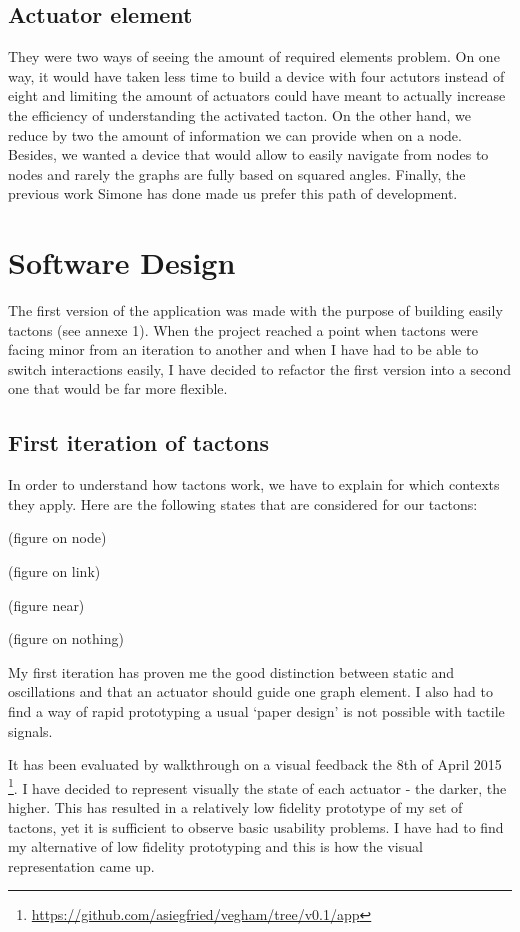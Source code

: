 \subsection{Actuator element}\label{actuator-element}

They were two ways of seeing the amount of required elements problem. On one way, it would have taken less time to build a device with four actutors instead of eight and limiting the amount of actuators could have meant to actually increase the efficiency of understanding the activated tacton. On the other hand, we reduce by two the amount of information we can provide when on a node. Besides, we wanted a device that would allow to easily navigate from nodes to nodes and rarely the graphs are fully based on squared angles. Finally, the previous work Simone has done made us prefer this path of development.

\section{Software Design}

The first version of the application was made with the purpose of building easily tactons (see annexe 1). When the project reached a point when tactons were facing minor from an iteration to another and when I have had to be able to switch interactions easily, I have decided to refactor the first version into a second one that would be far more flexible.

\subsection{First iteration of
tactons}\label{first-iteration-of-tactons}

In order to understand how tactons work, we have to explain for which
contexts they apply. Here are the following states that are considered
for our tactons:

(figure on node)

(figure on link)

(figure near)

(figure on nothing)

My first iteration has proven me the good distinction between static and
oscillations and that an actuator should guide one graph element. I also
had to find a way of rapid prototyping a usual `paper design' is not
possible with tactile signals.

It has been evaluated by walkthrough on a visual feedback the 8th of
April 2015 \footnote{\url{https://github.com/asiegfried/vegham/tree/v0.1/app}}.
I have decided to represent visually the state of each actuator - the
darker, the higher. This has resulted in a relatively low fidelity
prototype of my set of tactons, yet it is sufficient to observe basic
usability problems. I have had to find my alternative of low fidelity
prototyping and this is how the visual representation came up.

